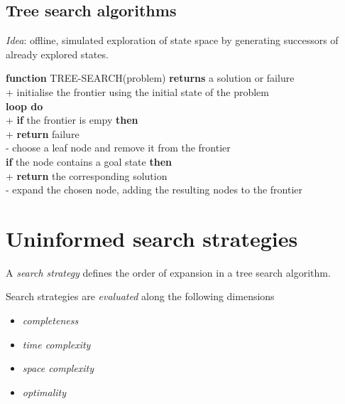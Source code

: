 \documentclass{article}
\begin{document}
\subsection{Tree search algorithms}

\emph{Idea}: offline, simulated exploration of state space by generating successors of already
explored states.

\begin{pseudo}
\textbf{function} TREE-SEARCH(problem) \textbf{returns} a solution or failure   \\+
    initialise the frontier using the initial state of the problem              \\
    \textbf{loop do}                                                            \\+
        \textbf{if} the frontier is empy \textbf{then}                          \\+
            \textbf{return} failure                                             \\-
        choose a leaf node and remove it from the frontier                      \\
        \textbf{if} the node contains a goal state \textbf{then}                \\+
            \textbf{return} the corresponding solution                          \\-
        expand the chosen node, adding the resulting nodes to the frontier
\end{pseudo}


\section{Uninformed search strategies}


\begin{definition}
    A \emph{search strategy} defines the order of expansion in a tree search algorithm.
\end{definition}

\begin{definition}
    Search strategies are \emph{evaluated} along the following
    dimensions
    \begin{itemize}
        \item \emph{completeness}
        \item \emph{time complexity}
        \item \emph{space complexity}
        \item \emph{optimality}
    \end{itemize}
\end{definition}
\end{document}
